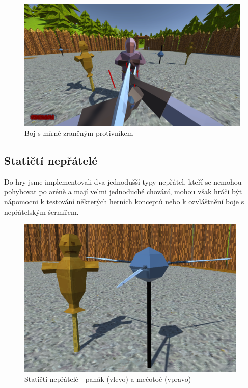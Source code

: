 \begin{figure}[!h]\centering
  \center
  \includegraphics[width=140mm]{../img/demogameFightEnemyBloodied.png}
  \caption{Boj s mírně zraněným protivníkem}
  \label{obr05:demogameEnemyBloodied}
\end{figure} 

\subsection{Statičtí nepřátelé}

Do hry jsme implementovali dva jednodušší typy nepřátel, kteří se nemohou pohybovat po aréně a mají velmi jednoduché chování, mohou však hráči být nápomocni k testování některých herních konceptů nebo k ozvláštnění boje s nepřátelským šermířem.

\begin{figure}[h!]\centering
  \center
  \includegraphics[width=110mm]{../img/demogameStaticEnemies.png}
  \caption{Statičtí nepřátelé - panák (vlevo) a mečotoč (vpravo)}
  \label{obr05:demogameStaticEnemies}
\end{figure} 


